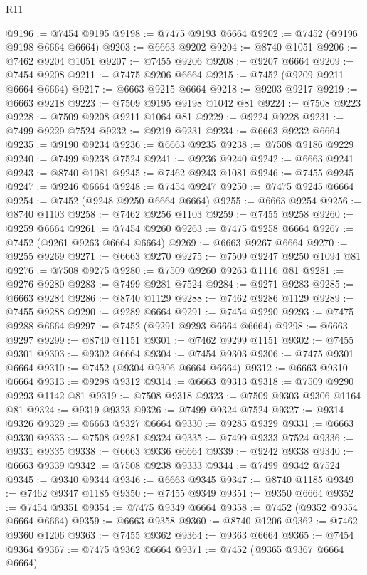 \begin{lexlean}{R11}
\begin{coremodule}
{{{{{{{{{{{{{{{{{{{{{{{{{{{{{{{{{{{{{{{{{{{{{{{{{{{{{{{{{{{{{{{{{{{{{{{{{{{{{{{{{{@9196 := @7454 @9195
@9198 := @7475 @9193 @6664
@9202 := @7452 (@9196 @9198 @6664 @6664)
@9203 := @6663 @9202
@9204 := @8740 @1051
@9206 := @7462 @9204 @1051
@9207 := @7455 @9206
@9208 := @9207 @6664
@9209 := @7454 @9208
@9211 := @7475 @9206 @6664
@9215 := @7452 (@9209 @9211 @6664 @6664)
@9217 := @6663 @9215 @6664
@9218 := @9203 @9217
@9219 := @6663 @9218
@9223 := @7509 @9195 @9198 @1042 @81
@9224 := @7508 @9223
@9228 := @7509 @9208 @9211 @1064 @81
@9229 := @9224 @9228
@9231 := @7499 @9229 @7524
@9232 := @9219 @9231
@9234 := @6663 @9232 @6664
@9235 := @9190 @9234
@9236 := @6663 @9235
@9238 := @7508 @9186 @9229
@9240 := @7499 @9238 @7524
@9241 := @9236 @9240
@9242 := @6663 @9241
@9243 := @8740 @1081
@9245 := @7462 @9243 @1081
@9246 := @7455 @9245
@9247 := @9246 @6664
@9248 := @7454 @9247
@9250 := @7475 @9245 @6664
@9254 := @7452 (@9248 @9250 @6664 @6664)
@9255 := @6663 @9254
@9256 := @8740 @1103
@9258 := @7462 @9256 @1103
@9259 := @7455 @9258
@9260 := @9259 @6664
@9261 := @7454 @9260
@9263 := @7475 @9258 @6664
@9267 := @7452 (@9261 @9263 @6664 @6664)
@9269 := @6663 @9267 @6664
@9270 := @9255 @9269
@9271 := @6663 @9270
@9275 := @7509 @9247 @9250 @1094 @81
@9276 := @7508 @9275
@9280 := @7509 @9260 @9263 @1116 @81
@9281 := @9276 @9280
@9283 := @7499 @9281 @7524
@9284 := @9271 @9283
@9285 := @6663 @9284
@9286 := @8740 @1129
@9288 := @7462 @9286 @1129
@9289 := @7455 @9288
@9290 := @9289 @6664
@9291 := @7454 @9290
@9293 := @7475 @9288 @6664
@9297 := @7452 (@9291 @9293 @6664 @6664)
@9298 := @6663 @9297
@9299 := @8740 @1151
@9301 := @7462 @9299 @1151
@9302 := @7455 @9301
@9303 := @9302 @6664
@9304 := @7454 @9303
@9306 := @7475 @9301 @6664
@9310 := @7452 (@9304 @9306 @6664 @6664)
@9312 := @6663 @9310 @6664
@9313 := @9298 @9312
@9314 := @6663 @9313
@9318 := @7509 @9290 @9293 @1142 @81
@9319 := @7508 @9318
@9323 := @7509 @9303 @9306 @1164 @81
@9324 := @9319 @9323
@9326 := @7499 @9324 @7524
@9327 := @9314 @9326
@9329 := @6663 @9327 @6664
@9330 := @9285 @9329
@9331 := @6663 @9330
@9333 := @7508 @9281 @9324
@9335 := @7499 @9333 @7524
@9336 := @9331 @9335
@9338 := @6663 @9336 @6664
@9339 := @9242 @9338
@9340 := @6663 @9339
@9342 := @7508 @9238 @9333
@9344 := @7499 @9342 @7524
@9345 := @9340 @9344
@9346 := @6663 @9345
@9347 := @8740 @1185
@9349 := @7462 @9347 @1185
@9350 := @7455 @9349
@9351 := @9350 @6664
@9352 := @7454 @9351
@9354 := @7475 @9349 @6664
@9358 := @7452 (@9352 @9354 @6664 @6664)
@9359 := @6663 @9358
@9360 := @8740 @1206
@9362 := @7462 @9360 @1206
@9363 := @7455 @9362
@9364 := @9363 @6664
@9365 := @7454 @9364
@9367 := @7475 @9362 @6664
@9371 := @7452 (@9365 @9367 @6664 @6664)
}}}}}}}}}}}}}}}}}}}}}}}}}}}}}}}}}}}}}}}}}}}}}}}}}}}}}}}}}}}}}}}}}}}}}}}}}}}}}}}}}}
\end{coremodule}
\end{lexlean}
